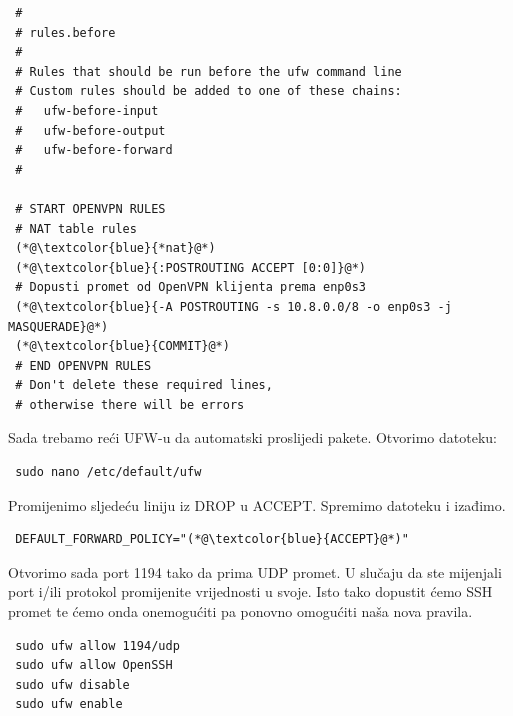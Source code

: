 \begin{lstlisting}
 #
 # rules.before
 #
 # Rules that should be run before the ufw command line 
 # Custom rules should be added to one of these chains:
 #   ufw-before-input
 #   ufw-before-output
 #   ufw-before-forward
 #
 
 # START OPENVPN RULES
 # NAT table rules
 (*@\textcolor{blue}{*nat}@*)
 (*@\textcolor{blue}{:POSTROUTING ACCEPT [0:0]}@*)
 # Dopusti promet od OpenVPN klijenta prema enp0s3 
 (*@\textcolor{blue}{-A POSTROUTING -s 10.8.0.0/8 -o enp0s3 -j MASQUERADE}@*)
 (*@\textcolor{blue}{COMMIT}@*)
 # END OPENVPN RULES
 # Don't delete these required lines, 
 # otherwise there will be errors
\end{lstlisting}
Sada trebamo reći UFW-u da automatski proslijedi pakete. Otvorimo datoteku:
\begin{lstlisting}
 sudo nano /etc/default/ufw
\end{lstlisting}
Promijenimo sljedeću liniju iz DROP u ACCEPT. Spremimo datoteku i izađimo.
\begin{lstlisting}
 DEFAULT_FORWARD_POLICY="(*@\textcolor{blue}{ACCEPT}@*)"
\end{lstlisting}
Otvorimo sada port 1194 tako da prima UDP promet. U slučaju da ste mijenjali port i/ili protokol promijenite vrijednosti u svoje. Isto tako dopustit ćemo SSH promet te ćemo onda onemogućiti pa ponovno omogućiti naša nova pravila.
\begin{lstlisting}
 sudo ufw allow 1194/udp
 sudo ufw allow OpenSSH
 sudo ufw disable
 sudo ufw enable
\end{lstlisting}
\bigbreak
